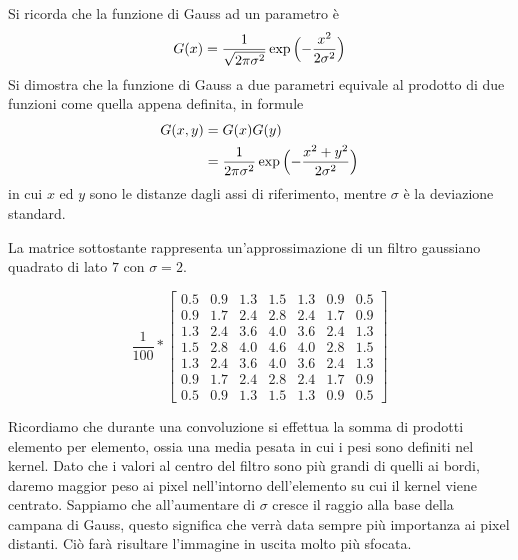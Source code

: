 Si ricorda che la funzione di Gauss ad un parametro è
\begin{equation*}
  G(x) = \frac{1}{\sqrt{2\pi\sigma^2}}
         \exp{\Bigl(- \frac{ x^2 }{ 2 \sigma^2 } \Bigr)} 
\end{equation*}
Si dimostra che la funzione di Gauss a due parametri equivale al prodotto di due funzioni come quella appena definita, in formule
\begin{equation}
  \begin{split}
    G(x,y) & = G(x)G(y) \\
           & = \frac{1}{2\pi\sigma^2}
               \exp{\Bigl(- \frac{ x^2 + y^2 }{ 2 \sigma^2 } \Bigr)} 
  \end{split}
\end{equation}
in cui $x$ ed $y$ sono le distanze dagli assi di riferimento, mentre $\sigma$ è la deviazione standard.
% 
% 

La matrice sottostante rappresenta un'approssimazione di un filtro gaussiano quadrato di lato $7$ con $\sigma = 2$.

\begin{equation*} %
  \frac{1}{100}*
  \begin{bmatrix}

    0.5 & 0.9 & 1.3 & 1.5 & 1.3 & 0.9 & 0.5\\
    0.9 & 1.7 & 2.4 & 2.8 & 2.4 & 1.7 & 0.9\\
    1.3 & 2.4 & 3.6 & 4.0 & 3.6 & 2.4 & 1.3\\
    1.5 & 2.8 & 4.0 & 4.6 & 4.0 & 2.8 & 1.5\\
    1.3 & 2.4 & 3.6 & 4.0 & 3.6 & 2.4 & 1.3\\
    0.9 & 1.7 & 2.4 & 2.8 & 2.4 & 1.7 & 0.9\\
    0.5 & 0.9 & 1.3 & 1.5 & 1.3 & 0.9 & 0.5

  \end{bmatrix}
\end{equation*}

Ricordiamo che durante una convoluzione si effettua la somma di prodotti elemento per elemento, ossia una media pesata in cui i pesi sono definiti nel kernel.
Dato che i valori al centro del filtro sono più grandi di quelli ai bordi, daremo maggior peso ai pixel nell'intorno dell'elemento su cui il kernel viene centrato.
Sappiamo che all'aumentare di $\sigma$ cresce il raggio alla base della campana di Gauss, questo significa che verrà data sempre più importanza ai pixel distanti.
Ciò farà risultare l'immagine in uscita molto più sfocata.

